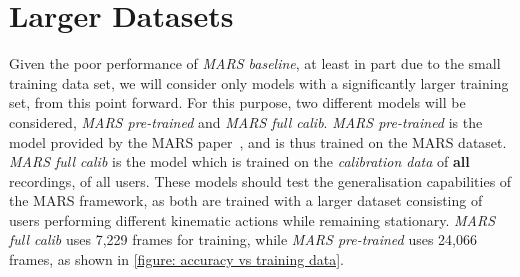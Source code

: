 \section{Larger Datasets}
\label{section: evaluation - larger models}


Given the poor performance of \textit{MARS baseline}, at least in part due to the small training data set, we will consider only models with a significantly larger training set, from this point forward.
For this purpose, two different models will be considered, \textit{MARS pre-trained} and \textit{MARS full calib}.
\textit{MARS pre-trained} is the model provided by the MARS paper~\cite{an2021mars}, and is thus trained on the MARS dataset.
\textit{MARS full calib} is the model which is trained on the \textit{calibration data} of \textbf{all} recordings, of all users.
These models should test the generalisation capabilities of the MARS framework, as both are trained with a larger dataset consisting of users performing different kinematic actions while remaining stationary.
\textit{MARS full calib} uses 7,229 frames for training, while \textit{MARS pre-trained} uses 24,066 frames, as shown in \cref{figure: accuracy vs training data}.




